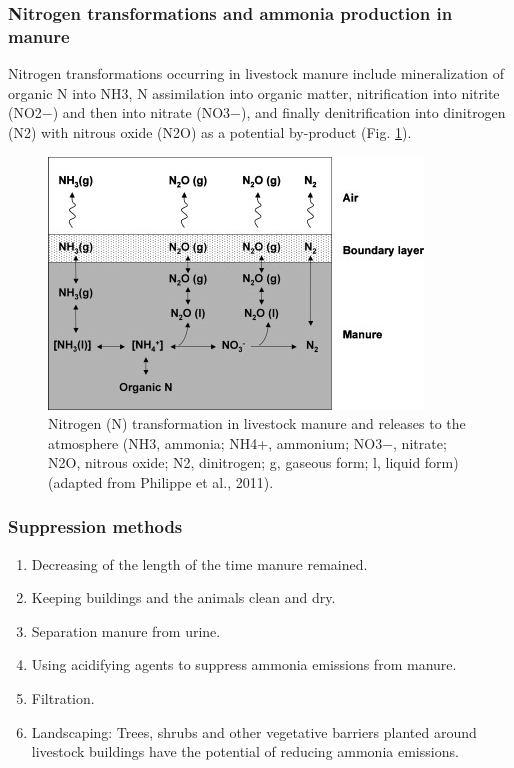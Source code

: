 \documentclass[]{book}
\providecommand{\tightlist}{%
  \setlength{\itemsep}{0pt}\setlength{\parskip}{0pt}}
\begin{document}
\subsubsection{Nitrogen transformations and ammonia production in
manure}\label{nitrogen-transformations-and-ammonia-production-in-manure}

Nitrogen transformations occurring in livestock manure include
mineralization of organic N into NH3, N assimilation into organic
matter, nitrification into nitrite (NO2−) and then into nitrate (NO3−),
and finally denitrification into dinitrogen (N2) with nitrous oxide
(N2O) as a potential by-product (Fig. \ref{fig:ammonia-trans}).

\begin{figure}

{\centering \includegraphics[width=0.5\linewidth]{figures/ammonia-trans} 

}

\caption{Nitrogen (N) transformation in livestock manure and releases to the atmosphere (NH3, ammonia; NH4+, ammonium; NO3−, nitrate; N2O, nitrous oxide; N2, dinitrogen; g, gaseous form; l, liquid form) (adapted from Philippe et al., 2011).}\label{fig:ammonia-trans}
\end{figure}

\subsubsection{Suppression methods}\label{suppression-methods}

\begin{enumerate}
\def\labelenumi{\arabic{enumi}.}
\tightlist
\item
  Decreasing of the length of the time manure remained.
\item
  Keeping buildings and the animals clean and dry.
\item
  Separation manure from urine.
\item
  Using acidifying agents to suppress ammonia emissions from manure.
\item
  Filtration.\\
\item
  Landscaping: Trees, shrubs and other vegetative barriers planted
  around livestock buildings have the potential of reducing ammonia
  emissions.
\end{enumerate}
\end{document}
